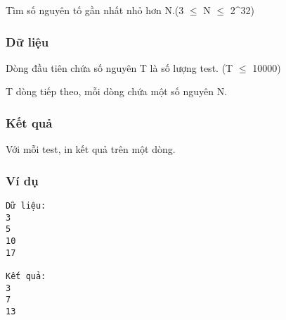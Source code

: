 



   Tìm số nguyên tố gần nhất nhỏ hơn N.(3  $\le$  N  $\le$  2^32)  

\subsubsection{   Dữ liệu  }

   Dòng đầu tiên chứa số nguyên T là số lượng test. (T  $\le$  10000)  

   T dòng tiếp theo, mỗi dòng chứa một số nguyên N.  

\subsubsection{   Kết quả  }

   Với mỗi test, in kết quả trên một dòng.  

\subsubsection{   Ví dụ  }
\begin{verbatim}
Dữ liệu:
3
5 
10
17

Kết quả:
3
7
13
\end{verbatim}
